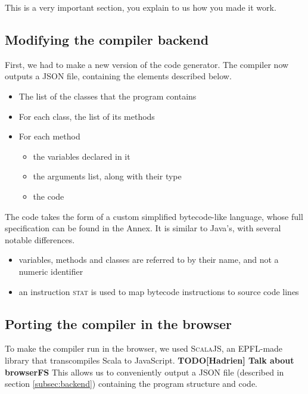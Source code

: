 This is a very important section, you explain to us how you made it work.

\subsection{Modifying the compiler backend}
\label{backend}

First, we had to make a new version of the code generator. The compiler now outputs a JSON file, containing the elements described below.

\begin{itemize}
\item The list of the classes that the program contains
\item For each class, the list of its methods
\item For each method
	\begin{itemize}
	\item the variables declared in it
	\item the arguments list, along with their type
	\item the code
	\end{itemize}
\end{itemize}

The code takes the form of a custom simplified bytecode-like language, whose full specification can be found in the Annex. It is similar to Java's, with several notable differences.

\begin{itemize}
\item variables, methods and classes are referred to by their name, and not a numeric identifier
\item an instruction \textsc{stat} is used to map bytecode instructions to source code lines
\end{itemize}





\subsection{Porting the compiler in the browser}

To make the compiler run in the browser, we used \textsc{ScalaJS}, an EPFL-made library that transcompiles Scala to JavaScript.
\textbf{TODO[Hadrien] Talk about browserFS}
This allows us to conveniently output a JSON file (described in section \ref{subsec:backend}) containing the program structure and code.


